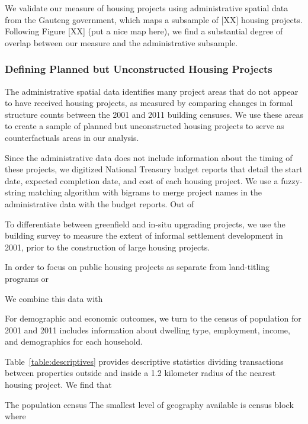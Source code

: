 \documentclass[12pt]{article}
\begin{document}
We validate our measure of housing projects using administrative spatial data from the Gauteng government, which maps a subsample of [XX] housing projects.  Following Figure [XX] (put a nice map here), we find a substantial degree of overlap between our measure and the administrative subsample.  

\subsubsection{Defining Planned but Unconstructed Housing Projects}

The administrative spatial data identifies many project areas that do not appear to have received housing projects, as measured by comparing changes in formal structure counts between the 2001 and 2011 building censuses.  We use these areas to create a sample of planned but unconstructed housing projects to serve as counterfactuals areas in our analysis.

Since the administrative data does not include information about the timing of these projects, we digitized National Treasury budget reports that detail the start date, expected completion date, and cost of each housing project.  We use a fuzzy-string matching algorithm with bigrams to merge project names in the administrative data with the budget reports.  Out of 


To differentiate between greenfield and in-situ upgrading projects, we use the building survey to measure the extent of informal settlement development in 2001, prior to the construction of large housing projects.  


In order to focus on public housing projects as separate from land-titling programs or 


We combine this data with 



For demographic and economic outcomes, we turn to the census of population for 2001 and 2011 includes information about dwelling type, employment, income, and demographics for each household. 




Table~\ref{table:descriptives} provides descriptive statistics dividing transactions between properties outside and inside a 1.2 kilometer radius of the nearest housing project.  We find that 



  The population census  The smallest level of geography available is census block where 
\end{document}
